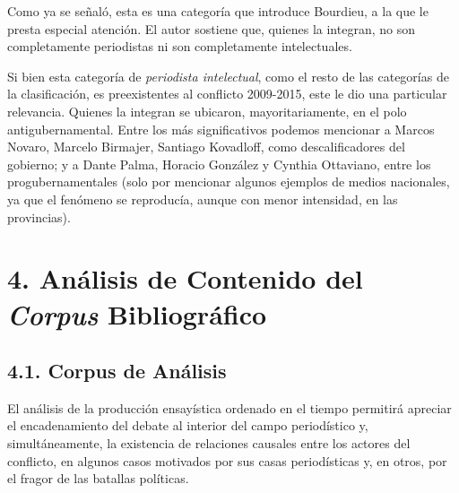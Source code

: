Como ya se señaló, esta es una categoría que introduce Bourdieu, a la que le presta especial atención. El autor sostiene que, quienes la integran, no son completamente periodistas ni son completamente intelectuales.

Si bien esta categoría de \emph{periodista intelectual}, como el resto de las categorías de la clasificación, es preexistentes al conflicto 2009-2015, este le dio una particular relevancia. Quienes la integran se ubicaron, mayoritariamente, en el polo antigubernamental. Entre los más significativos podemos mencionar a Marcos Novaro, Marcelo Birmajer, Santiago Kovadloff, como descalificadores del gobierno; y a Dante Palma, Horacio González y Cynthia Ottaviano, entre los progubernamentales (solo por mencionar algunos ejemplos de medios nacionales, ya que el fenómeno se reproducía, aunque con menor intensidad, en las provincias).

\chapter{4. Análisis de Contenido del \emph{Corpus} Bibliográfico}


\section{4.1. Corpus de Análisis}

El análisis de la producción ensayística ordenado en el tiempo permitirá apreciar el encadenamiento del debate al interior del campo periodístico y, simultáneamente, la existencia de relaciones causales entre los actores del conflicto, en algunos casos motivados por sus casas periodísticas y, en otros, por el fragor de las batallas políticas.

